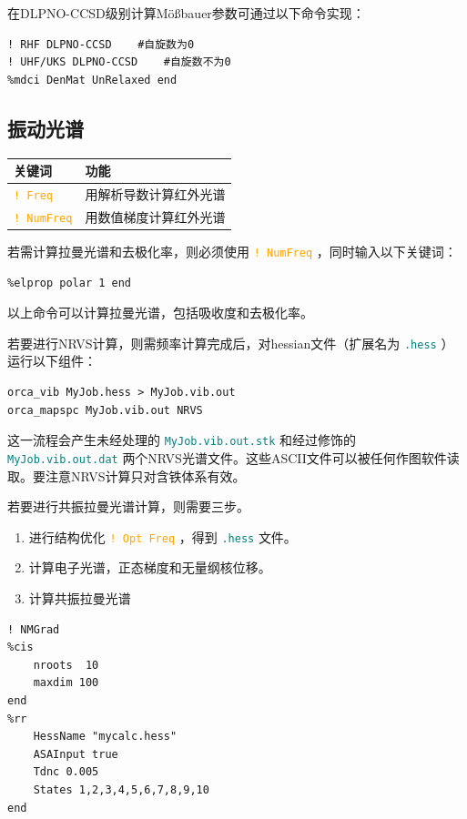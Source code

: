 \documentclass{ctexart}
\newcommand{\cmd}[1]{\textcolor{orange}{ \texttt{#1} }}
\newcommand{\file}[1]{\textcolor{teal}{ \texttt{#1} }}
\begin{document}
	在DLPNO-CCSD级别计算Mößbauer参数可通过以下命令实现：
	\begin{lstlisting}
! RHF DLPNO-CCSD	#自旋数为0
! UHF/UKS DLPNO-CCSD	#自旋数不为0
%mdci DenMat UnRelaxed end
	\end{lstlisting}
	
	\subsection{振动光谱} 
	
	\begin{table}[H]
		\centering
		\begin{tabular}{ll}
			\toprule
			\textbf{关键词}         & \textbf{功能 }         \\
			\midrule
			\cmd{! Freq}   & 用解析导数计算红外光谱 \\
			\cmd{! NumFreq} & 用数值梯度计算红外光谱\\
			\bottomrule
		\end{tabular}
	\end{table}
	
	若需计算拉曼光谱和去极化率，则必须使用\cmd{! NumFreq}，同时输入以下关键词：
	
	\begin{lstlisting}
%elprop polar 1 end
	\end{lstlisting}
	
	以上命令可以计算拉曼光谱，包括吸收度和去极化率。
	
	若要进行NRVS计算，则需频率计算完成后，对hessian文件（扩展名为\file{.hess}）运行以下组件：
	
	\begin{lstlisting}
orca_vib MyJob.hess > MyJob.vib.out 
orca_mapspc MyJob.vib.out NRVS
	\end{lstlisting}
	
	这一流程会产生未经处理的\file{MyJob.vib.out.stk}和经过修饰的\file{MyJob.vib.out.dat}两个NRVS光谱文件。这些ASCII文件可以被任何作图软件读取。要注意NRVS计算只对含铁体系有效。
	
	若要进行共振拉曼光谱计算，则需要三步。
	\begin{enumerate}[1.]
		\item 进行结构优化\cmd{! Opt Freq}，得到\file{.hess}文件。
		\item 计算电子光谱，正态梯度和无量纲核位移。
		\item 计算共振拉曼光谱
	\end{enumerate}

	\begin{lstlisting}
! NMGrad
%cis 
	nroots	10	
	maxdim 100
end
%rr
	HessName "mycalc.hess"
	ASAInput true
	Tdnc 0.005
	States 1,2,3,4,5,6,7,8,9,10
end
	\end{lstlisting}
	
\end{document}
